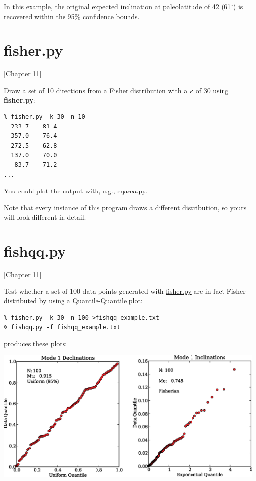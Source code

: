 \documentclass[11pt]{book}
\begin{document}
{{{In this example, the original expected inclination at paleolatitude of 42 (61$^{\circ}$) is recovered within the 95\% confidence bounds.  

%

\section {\bf fisher.py}
\href{http://Webbook2.html#Fisher_statistics}{ [Chapter 11]}

Draw a set of 10 directions from a Fisher distribution with a $\kappa$ of 30 using {\bf fisher.py}:

\begin{verbatim}
% fisher.py -k 30 -n 10
  233.7    81.4 
  357.0    76.4 
  272.5    62.8 
  137.0    70.0 
   83.7    71.2 
...
  \end{verbatim}
  
  You could plot the output with, e.g., \href{#eqarea.py}{eqarea.py}.  
  
  Note that every instance of this program draws a different distribution, so yours will look different in detail.  


\section {\bf fishqq.py} 
\href{http://Webbook2.html#Fisher_statistics}{ [Chapter 11]}

Test whether a set of 100 data points generated with \href{#fisher.py}{fisher.py} are in fact Fisher distributed by using a Quantile-Quantile plot:

\begin{verbatim}
% fisher.py -k 30 -n 100 >fishqq_example.txt
% fishqq.py -f fishqq_example.txt 
\end{verbatim}

\noindent produces these plots:



\includegraphics[width=15cm]{EPSfiles/fishqq-ex.eps}

}}}
\end{document}
